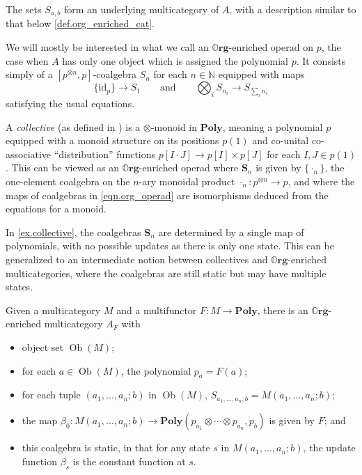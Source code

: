 \documentclass[11pt, one side, article]{memoir}
\theoremstyle{definition}
\theoremstyle{plain}
\newenvironment{example}
  {\pushQED{\qed}\renewcommand{\qedsymbol}{$\lozenge$}\examplex}
  {\popQED\endexamplex}
\DeclareMathOperator{\ob}{Ob}
\newcommand{\Cat}[1]{\mathbf{#1}}%
\newcommand{\id}{\mathrm{id}}
\newcommand{\nn}{\mathbb{N}}
\newcommand{\poly}{\Cat{Poly}}
\newcommand{\0}{\textsf{0}}
\newcommand{\1}{\tn{\textsf{1}}}
\newcommand{\qqand}{\qquad\text{and}\qquad}
\newcommand{\org}{{\mathbb{O}\Cat{rg}}}
\renewcommand{\S}{{\Cat{S}}}
\newcommand{\idcoalg}[1]{{\{\id_{#1}\}}}
\newcommand{\dnote}[1]{{\color{blue}David says:}~#1.\quad{\color{blue}$\lozenge$}}
\begin{document}
The sets $S_{a,b}$ form an underlying multicategory of $A$, with a description similar to that below \cref{def.org_enriched_cat}. 

We will mostly be interested in what we call an $\org$-enriched operad on $p$, the case when $A$ has only one object which is assigned the polynomial $p$. It consists simply of a $[p^{\otimes n},p]$-coalgebra $S_n$ for each $n \in \nn$ equipped with maps
\begin{equation}\label{eqn.org_operad}
\idcoalg{p} \to S_1
\qqand
\bigotimes_i S_{n_i} \to S_{\sum_i n_i}
\end{equation}
satisfying the usual equations. %

\begin{example}\label{ex.collective}
A \emph{collective} (as defined in \cite{niu2021collectives}) is a $\otimes$-monoid in $\poly$, meaning a polynomial $p$ equipped with a monoid structure on its positions $p(1)$ and co-unital co-associative ``distribution'' functions $p[I \cdot J] \to p[I] \times p[J]$ for each $I,J \in p(1)$. This can be viewed as an $\org$-enriched operad where $\S_n$ is given by $\{\cdot_n\}$, the one-element coalgebra on the $n$-ary monoidal product $\cdot_n : p^{\otimes n} \to p$, and where the maps of coalgebras in \eqref{eqn.org_operad} are isomorphisms deduced from the equations for a monoid.
\end{example}

\begin{example}
In \cref{ex.collective}, the coalgebras $\S_n$ are determined by a single map of polynomials, with no possible updates as there is only one state. This can be generalized to an intermediate notion between collectives and $\org$-enriched multicategories, where the coalgebras are still static but may have multiple states.

Given a multicategory $M$ and a multifunctor $F : M \to \poly$, there is an $\org$-enriched multicategory $A_F$ with 
\begin{itemize}
	\item object set $\ob(M)$;
	\item for each $a \in \ob(M)$, the polynomial $p_a = F(a)$;
	\item for each tuple $(a_1,...,a_n;b)$ in $\ob(M)$, $S_{a_1,...,a_n;b} = M(a_1,...,a_n;b)$;
	\item the map $\beta_0 : M(a_1,...,a_n;b) \to \poly(p_{a_1} \otimes \cdots \otimes p_{a_n},p_b)$ is given by $F$; and 
	\item this coalgebra is static, in that for any state $s$ in $M(a_1,...,a_n;b)$, the update function $\beta_s$ is the constant function at $s$.
	\qedhere
\end{itemize}
\end{example}
\end{document}
